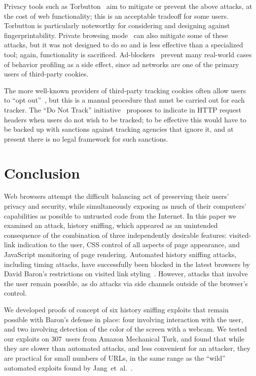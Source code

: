 \documentclass[conference]{IEEEtran}
\begin{document}
Privacy tools such as Torbutton~\cite{torbutton} aim to mitigate or
prevent the above attacks, at the cost of web functionality; this is
an acceptable tradeoff for some users.  Torbutton is particularly
noteworthy for considering and designing against fingerprintability.
Private browsing mode~\cite{private_browsing_paper} can also mitigate
some of these attacks, but it was not designed to do so and is less
effective than a specialized tool; again, functionality is sacrificed.
Ad-blockers~\cite{adblock} prevent many real-world cases of behavior
profiling as a side effect, since ad networks are one of the primary
users of third-party cookies.

The more well-known providers of third-party tracking cookies often
allow users to “opt out”~\cite{wpfoptout}, but this is a manual
procedure that must be carried out for each tracker.  The “Do Not
Track” initiative~\cite{donottrack} proposes to indicate in HTTP
request headers when users do not wish to be tracked; to be effective
this would have to be backed up with sanctions against tracking
agencies that ignore it, and at present there is no legal framework
for such sanctions.

\section{Conclusion}\label{sec:conclusion}

Web browsers attempt the difficult balancing act of preserving their
users' privacy and security, while simultaneously exposing as much of
their computers' capabilities as possible to untrusted code from the
Internet.  In this paper we examined an attack, history sniffing,
which appeared as an unintended consequence of the combination of
three independently desirable features: visited-link indication to the
user, CSS control of all aspects of page appearance, and JavaScript
monitoring of page rendering.  Automated history sniffing attacks,
including timing attacks, have successfully been blocked in the latest
browsers by David Baron's restrictions on visited link
styling~\cite{moz_visited_defense}.  However, attacks that involve the
user remain possible, as do attacks via side channels outside of the
browser's control.

We developed proofs of concept of six history sniffing exploits that
remain possible with Baron's defense in place: four involving
interaction with the user, and two involving detection of the color of
the screen with a webcam.  We tested our exploits on 307~users from
Amazon Mechanical Turk, and found that while they are slower than
automated attacks, and less convenient for an attacker, they are
practical for small numbers of URLs, in the same range as the “wild”
automated exploits found by Jang~et~al.~\cite{jang10empirical}.
\end{document}
